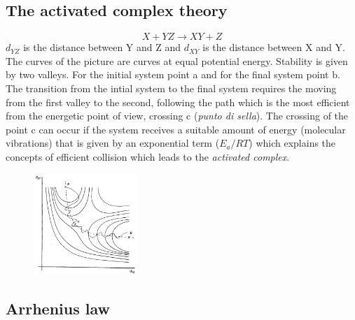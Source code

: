 \documentclass[12pt]{article}
\begin{document}
\subsection{The activated complex theory}

\begin{equation}
    X+YZ \rightarrow XY+Z
\end{equation}
$d_{YZ}$ is the distance between Y and Z and $d_{XY}$ is the distance between X and Y. The curves of the picture are curves at equal potential energy. Stability is given by two valleys. For the initial system point a and for the final system point b.
The transition from the intial system to the final system requires the moving from the first valley to the second, following the path which is the most efficient from the energetic point of view, crossing c (\textit{punto di sella}). The crossing of the point c can occur if the system receives a suitable amount of energy (molecular vibrations) that is given by an exponential term ($E_{a}/RT$) which explains the concepts of efficient collision which leads to the \textit{activated complex}.

\begin{figure}[!ht]
\centering
\includegraphics[width=0.35\textwidth]{figures/pointc.png}
\end{figure}



\subsection{Arrhenius law}
\end{document}
